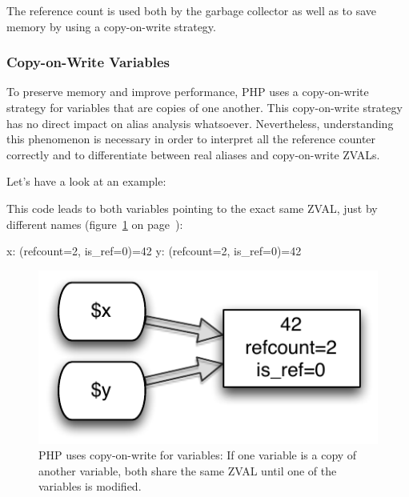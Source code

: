 The reference count is used both by the garbage collector as well as to save memory by using a copy-on-write strategy.~\cite{php-manual-reference-counting}


\subsubsection{Copy-on-Write Variables}
\label{sec:copy-on-write}

To preserve memory and improve performance, PHP uses a copy-on-write strategy for variables that are copies of one another. This copy-on-write strategy has no direct im\-pact on alias analysis whatsoever. Nevertheless, understanding this phenomenon is necessary in order to interpret all the reference counter correctly and to differentiate between real aliases and copy-on-write ZVALs.

Let's have a look at an example:


This code leads to both variables pointing to the exact same ZVAL, just by different names (figure~\ref{fig:copy-on-write-variable} on page~\pageref{fig:copy-on-write-variable}):

\begin{textcode}
x: (refcount=2, is_ref=0)=42
y: (refcount=2, is_ref=0)=42
\end{textcode}

\begin{figure}[htb]
  \begin{center}
    \includegraphics[scale=0.8]{images/x_y_42}
    \caption{PHP uses copy-on-write for variables: If one variable is a copy of another variable, both share the same ZVAL until one of the variables is modified.}
    \label{fig:copy-on-write-variable}
  \end{center}
\end{figure}



